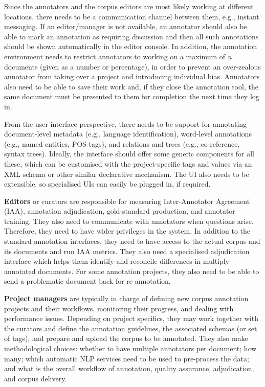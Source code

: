 Since the annotators and the corpus editors are most likely working at different locations, there needs to be a communication channel between them, e.g., instant messaging. If an editor/manager is not available, an annotator should also be able to mark an annotation as requiring discussion and then all such annotations should be shown automatically in the editor console. In addition, the annotation environment needs to restrict annotators to working on a maximum of \emph{n} documents (given as a number or percentage), in order to prevent an over-zealous annotator from taking over a project and introducing individual bias. Annotators also need to be able to save their work and, if they close the annotation tool, the same document must be presented to them for completion the next time they log in.  

From the user interface perspective, there needs to be support for annotating document-level metadata (e.g., language identification), word-level annotations (e.g., named entities, POS tags), and relations and trees (e.g., co-reference, syntax trees). Ideally, the interface should offer some generic components for all these, which can be customised with the project-specific tags and values via an XML schema or other similar declarative mechanism. The UI also needs to be extensible, so specialised UIs can easily be plugged in, if required. 

{\bf Editors} or curators are responsible for measuring Inter-Annotator Agreement (IAA), annotation adjudication, gold-standard production, and annotator training. They also need to communicate with annotators when questions arise. Therefore, they need to have wider privileges in the system. In addition to the standard annotation interfaces, they need to have access to the actual corpus and its documents and run IAA metrics. They also need a specialised adjudication interface which helps them identify and reconcile differences in multiply annotated documents. For some annotation projects, they also need to be able to send a problematic document back for re-annotation. 

{\bf Project managers} are typically in charge of defining new corpus annotation projects and their workflows, monitoring their progress, and dealing with performance issues. Depending on project specifics, they may work together with the curators and define the annotation guidelines, the associated schemas (or set of tags), and prepare and upload the corpus to be annotated. They also make methodological choices: whether to have multiple annotators per document; how many; which automatic NLP services need to be used to pre-process the data; and what is the overall workflow of annotation, quality assurance, adjudication, and corpus delivery.  

